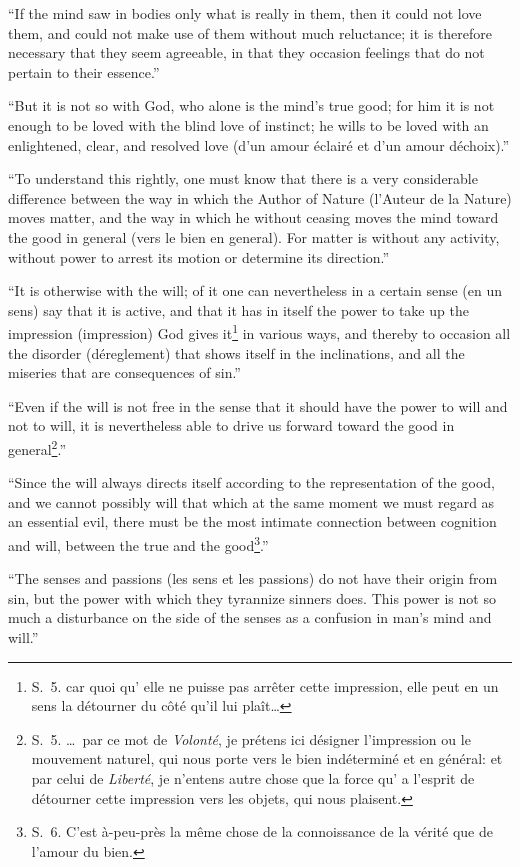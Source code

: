 \documentclass[12pt,a4paper]{article}
\begin{document}
``If the mind saw in bodies only what is really in them, then it could not love
them, and could not make use of them without much reluctance; it is therefore
necessary that they seem agreeable, in that they occasion feelings that do not
pertain to their essence.''

``But it is not so with God, who alone is the mind's true good; for him it is not
enough to be loved with the blind love of instinct; he wills to be loved with an
enlightened, clear, and resolved love (d'un amour éclairé et d'un amour
déchoix).''

``To understand this rightly, one must know that there is a very considerable
difference between the way in which the Author of Nature (l'Auteur de la Nature)
moves matter, and the way in which he without ceasing moves the mind toward the
good in general (vers le bien en general). For matter is without any activity,
without power to arrest its motion or determine its direction.''

``It is otherwise with the will; of it one can nevertheless in a certain sense
(en un sens) say that it is active, and that it has in itself the power to take up
the impression (impression) God gives
it\footnote{S.~5. car quoi qu' elle ne puisse pas arrêter cette impression, elle
peut en un sens la détourner du côté qu'il lui plaît\dots} in various ways, and
thereby to occasion all the disorder (déreglement) that shows itself in the
inclinations, and all the miseries that are consequences of sin.''

``Even if the will is not free in the sense that it should have the power to will
and not to will, it is nevertheless able to drive us forward toward the good in
general\footnote{S.~5. \dots\ par ce mot de \emph{Volonté}, je prétens ici
désigner l'impression ou le mouvement naturel, qui nous porte vers le bien
indéterminé et en général: et par celui de \emph{Liberté}, je n'entens autre
chose que la force qu' a l'esprit de détourner cette impression vers les objets,
qui nous plaisent.}.''

``Since the will always directs itself according to the representation of the
good, and we cannot possibly will that which at the same moment we must regard as
an essential evil, there must be the most intimate connection between cognition
and will, between the true and the good\footnote{S.~6. C'est à-peu-près la même
chose de la connoissance de la vérité que de l'amour du bien.}.''

``The senses and passions (les sens et les passions) do not have their origin
from sin, but the power with which they tyrannize sinners does. This power is not
so much a disturbance on the side of the senses as a confusion in man's mind and
will.''
\end{document}
